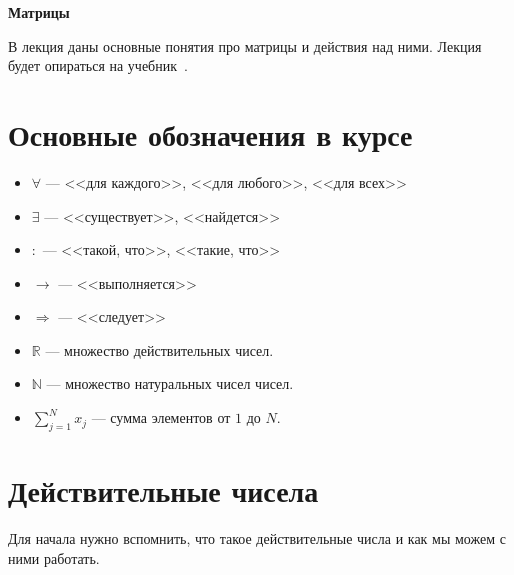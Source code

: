 \documentclass[12pt, twoside]{article}
\begin{document}
 

\begin{center}
{\LARGE\bf
Матрицы
}
\end{center}

В лекция даны основные понятия про матрицы и действия над ними. Лекция будет опираться на учебник~\cite{Beklemishev}.

\section{Основные обозначения в курсе}
\begin{itemize}
	\item $\forall$ --- <<для каждого>>, <<для любого>>, <<для всех>>
	\item $\exists$ --- <<существует>>, <<найдется>>
	\item $:$ --- <<такой, что>>, <<такие, что>>
	\item $\rightarrow$ --- <<выполняется>>
	\item $\Rightarrow$ --- <<следует>>
	\item $\mathbb{R}$ --- множество действительных чисел.
	\item $\mathbb{N}$ --- множество натуральных чисел чисел.
	\item $\sum_{j=1}^{N} x_j$ --- сумма элементов от $1$ до $N$.
\end{itemize}

\section{Действительные чисела}
Для начала нужно вспомнить, что такое действительные числа и как мы можем с ними работать.
\end{document}
